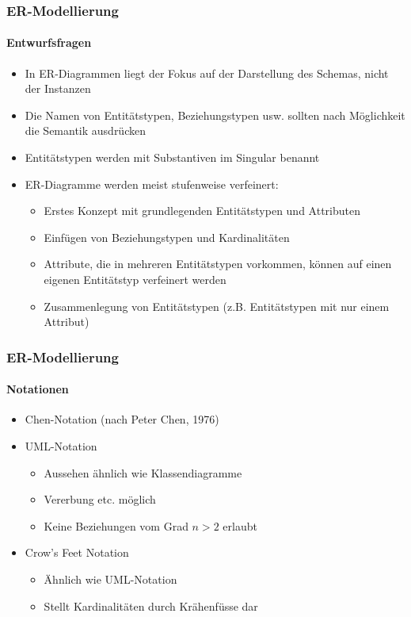 \begin{frame}[t]\frametitle{ER-Modellierung}
\framesubtitle{Entwurfsfragen}
\begin{itemize}
\item In ER-Diagrammen liegt der Fokus auf der Darstellung des Schemas, nicht der Instanzen
\item Die Namen von Entitätstypen, Beziehungstypen usw. sollten nach Möglichkeit die Semantik ausdrücken
\item Entitätstypen werden mit Substantiven im Singular benannt
\item ER-Diagramme werden meist stufenweise verfeinert: 
\begin{itemize}
\item Erstes Konzept mit grundlegenden Entitätstypen und Attributen
\item Einfügen von Beziehungstypen und Kardinalitäten
\item Attribute, die in mehreren Entitätstypen vorkommen, können auf einen eigenen Entitätstyp verfeinert werden
\item Zusammenlegung von Entitätstypen (z.B. Entitätstypen mit nur einem Attribut)
\end{itemize}
\end{itemize}
\end{frame}

\begin{frame}[t]\frametitle{ER-Modellierung}
\framesubtitle{Notationen}
\begin{itemize}
\item Chen-Notation (nach Peter Chen, 1976)
\item UML-Notation
\begin{itemize}
\item Aussehen ähnlich wie Klassendiagramme 
\item Vererbung etc. möglich
\item Keine Beziehungen vom Grad $n>2$ erlaubt
\end{itemize}
\item Crow's Feet Notation 
\begin{itemize}
\item Ähnlich wie UML-Notation
\item Stellt Kardinalitäten durch Krähenfüsse dar
\end{itemize}
\end{itemize}
\abs
{}
\end{frame}


